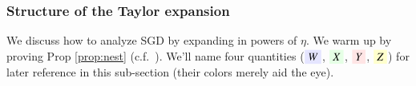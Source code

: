         \label{sect:using}\label{sect:diagrams}



    \subsubsection{Structure of the Taylor expansion} %
    We discuss how to analyze SGD by expanding in powers of $\eta$.  We warm up
    by proving Prop \ref{prop:nest} (c.f.\ \cite{ne04,ro18}). 
        We'll name four quantities (${\translucent{moosky}{$W$}}$,
        ${\translucent{moolime}{$X$}}$, ${\translucent{moopink}{$Y$}}$,
        ${\translucent{moogold}{$Z$}}$) for later reference in this
        sub-section (their colors merely aid the eye).

